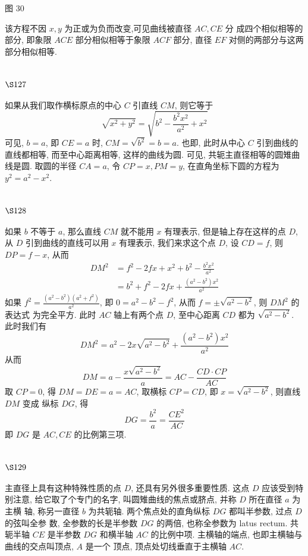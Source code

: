 图 30

该方程不因 $x, y$ 为正或为负而改变,可见曲线被直径 $A C, C E$ 分 成四个相似相等的部分, 即象限 $A C E$ 部分相似相等于象限 $A C F$ 部分, 直径 $E F$ 对侧的两部分与这两部分相似相等.

\section{$\S 127$}

如果从我们取作横标原点的中心 $C$ 引直线 $C M$, 则它等于
\[
\sqrt{x^{2}+y^{2}}=\sqrt{b^{2}-\frac{b^{2} x^{2}}{a^{2}}+x^{2}}
\]
可见, $b=a$, 即 $C E=a$ 时, $C M=\sqrt{b^{2}}=b=a$. 也即, 此时从中心 $C$ 引到曲线的直线都相等, 而至中心距离相等, 这样的曲线为圆. 可见, 共轭主直径相等的圆雉曲线是圆. 取圆的半径 $C A=a$, 令 $C P=x, P M=y$, 在直角坐标下圆的方程为 $y^{2}=a^{2}-x^{2}$.

\section{$\S 128$}

如果 $b$ 不等于 $a$, 那么直线 $C M$ 就不能用 $x$ 有理表示, 但是轴上存在这样的点 $D$, 从 $D$ 引到曲线的直线可以用 $x$ 有理表示, 我们来求这个点 $D$, 设 $C D=f$, 则 $D P=f-x$, 从而
\[
\begin{aligned}
D M^{2} & =f^{2}-2 f x+x^{2}+b^{2}-\frac{b^{2} x^{2}}{a^{2}} \\
& =b^{2}+f^{2}-2 f x+\frac{\left(a^{2}-b^{2}\right) x^{2}}{a^{2}}
\end{aligned}
\]
如果 $f^{2}=\frac{\left(a^{2}-b^{2}\right)\left(a^{2}+f^{2}\right)}{a^{2}}$, 即 $0=a^{2}-b^{2}-f^{2}$, 从而 $f=\pm \sqrt{a^{2}-b^{2}}$, 则 $D M^{2}$ 的表达式 为完全平方. 此时 $A C$ 轴上有两个点 $D$, 至中心距离 $C D$ 都为 $\sqrt{a^{2}-b^{2}}$. 此时我们有
\[
D M^{2}=a^{2}-2 x \sqrt{a^{2}-b^{2}}+\frac{\left(a^{2}-b^{2}\right) x^{2}}{a^{2}}
\]
从而
\[
D M=a-\frac{x \sqrt{a^{2}-b^{2}}}{a}=A C-\frac{C D \cdot C P}{A C}
\]
取 $C P=0$, 得 $D M=D E=a=A C$, 取横标 $C P=C D$, 即 $x=\sqrt{a^{2}-b^{2}}$, 则直线 $D M$ 变成 纵标 $D G$, 得
\[
D G=\frac{b^{2}}{a}=\frac{C E^{2}}{A C}
\]
即 $D G$ 是 $A C, C E$ 的比例第三项.

\section{$\S 129$}

主直径上具有这种特殊性质的点 $D$, 还具有另外很多重要性质. 这点 $D$ 应该受到特 别注意, 给它取了个专门的名字, 叫圆雉曲线的焦点或脐点, 并称 $D$ 所在直径 $a$ 为主横 轴, 称另一直径 $b$ 为共轭轴. 两个焦点处的直角纵标 $D G$ 都叫半参数, 过点 $D$ 的弦叫全参 数, 全参数的长是半参数 $D G$ 的两倍, 也称全参数为 latus rectum. 共轭半轴 $C E$ 是半参数 $D G$ 和横半轴 $A C$ 的比例中项. 主横轴的端点, 也即主横轴与曲线的交点叫顶点, $A$ 是一个 顶点, 顶点处切线垂直于主横轴 $A C$.

